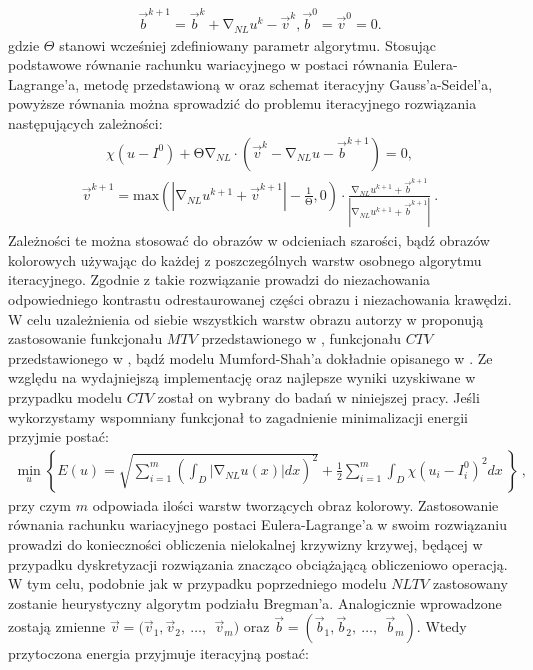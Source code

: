 \documentclass[a4paper,12pt,twoside,openany]{report}
\begin{document}
\begin{align}
{\overrightarrow{b}}^{k+1}={\overrightarrow{b}}^k+{\mathrm{\nabla }}_{NL}u^k-{\overrightarrow{v}}^k, {\overrightarrow{b}}^0={\overrightarrow{v}}^0=0.
\label{BREGMANVARIABLE}
\end{align}
gdzie $\Theta$ stanowi wcześniej zdefiniowany parametr algorytmu. Stosując podstawowe równanie rachunku wariacyjnego w postaci równania Eulera-Lagrange’a, metodę przedstawioną w \cite{tai2011fast} oraz schemat iteracyjny Gauss’a-Seidel’a, powyższe równania można sprowadzić do problemu iteracyjnego rozwiązania następujących zależności:
\begin{align}
\chi \left(u-I^0\right)+\mathrm{\Theta }{\mathrm{\nabla }}_{NL}\cdot \left({\overrightarrow{v}}^k-{\mathrm{\nabla }}_{NL}u-{\overrightarrow{b}}^{k+1}\right)=0,
\label{ELNLTV1}
\end{align}
\begin{align}
{\overrightarrow{v}}^{k+1}\mathrm{=}{\mathrm{max} \left(\left|{\mathrm{\nabla }}_{NL}u^{k+1}+{\overrightarrow{v}}^{k+1}\right|-\frac{1}{\mathrm{\Theta }},0\right)\cdot\frac{{\mathrm{\nabla }}_{NL}u^{k+1}+{\overrightarrow{b}}^{k+1}}{\left|{\mathrm{\nabla }}_{NL}u^{k+1}+{\overrightarrow{b}}^{k+1}\right|}\ }.
\label{ELNLTV2}
\end{align}
Zależności te można stosować do obrazów w odcieniach szarości, bądź obrazów kolorowych używając do  każdej z poszczególnych warstw osobnego algorytmu iteracyjnego. Zgodnie z \cite{duan2015fast} takie rozwiązanie prowadzi do niezachowania odpowiedniego kontrastu odrestaurowanej części obrazu i niezachowania krawędzi.
W celu uzależnienia od siebie wszystkich warstw obrazu autorzy w \cite{duan2015fast} proponują zastosowanie funkcjonału $MTV$ przedstawionego w \cite{yang2009fast}, funkcjonału $CTV$ przedstawionego w \cite{blomgren1998color}, bądź modelu Mumford-Shah’a dokładnie opisanego w \cite{jung2011nonlocal}. Ze względu na wydajniejszą implementację oraz najlepsze wyniki uzyskiwane w przypadku modelu \textbf{$CTV$} został on wybrany do badań w niniejszej pracy. Jeśli wykorzystamy wspomniany funkcjonał to zagadnienie minimalizacji energii przyjmie postać:
\begin{align}
{\mathop{\mathrm{min}}_{u} \left\{E\left(u\right)=\sqrt{\sum^m_{i=1}{{\left(\int_D{\left|{\mathrm{\nabla }}_{NL}u(x)\right|}dx\right)}^2}}+\frac{1}{2}\sum^m_{i=1}{\int_D{\chi{\left(u_i-I^0_i\right)}^2}dx}\ \right\}\ },
\label{ENLCTV}
\end{align}
przy czym $m$ odpowiada ilości warstw tworzących obraz kolorowy. Zastosowanie równania rachunku wariacyjnego postaci Eulera-Lagrange’a w swoim rozwiązaniu prowadzi do konieczności obliczenia nielokalnej krzywizny krzywej, będącej w przypadku dyskretyzacji rozwiązania znacząco obciążającą obliczeniowo operacją. W tym celu, podobnie jak w przypadku poprzedniego modelu $NLTV$ zastosowany zostanie heurystyczny algorytm podziału Bregman’a. Analogicznie wprowadzone zostają zmienne $\overrightarrow{v}=\big({\overrightarrow{v}}_1,{\overrightarrow{v}}_2,\ \dots ,\ \ {\overrightarrow{v}}_m\big)$ oraz $\overrightarrow{b}=\left({\overrightarrow{b}}_1,{\overrightarrow{b}}_2,\ \dots ,\ \ {\overrightarrow{b}}_m\right)$. Wtedy przytoczona energia przyjmuje iteracyjną postać:
\end{document}

